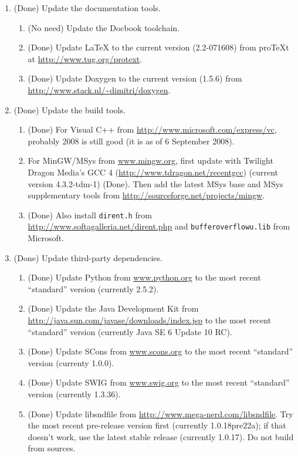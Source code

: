 \documentclass[11pt,letterpaper,onecolumn]{scrartcl}
\begin{document}
\begin{sloppypar}
\begin{enumerate}
	\item (Done) Update the documentation tools.
		\begin{enumerate}
	    \item (No need) Update the Docbook toolchain.
	    \item (Done) Update LaTeX to the current version (2.2-071608) from proTeXt at \url{http://www.tug.org/protext}.
	    \item (Done) Update Doxygen to the current version (1.5.6) from \url{http://www.stack.nl/~dimitri/doxygen}.
		\end{enumerate}
	\item (Done) Update the build tools.   
		\begin{enumerate}
			\item (Done) For Visual C++ from \url{http://www.microsoft.com/express/vc}, probably 2008 is still good (it is as of 6 September 2008). 
			\item For MinGW/MSys from \url{www.mingw.org}, first update with Twilight Dragon Media's GCC 4 (\url{http://www.tdragon.net/recentgcc}) (current version 4.3.2-tdm-1) (Done). Then add the latest MSys base and MSys supplementary tools from \url{http://sourceforge.net/projects/mingw}.
			\item (Done) Also install \texttt{dirent.h} from \url{http://www.softagalleria.net/dirent.php} and \texttt{bufferoverflowu.lib}  from Microsoft.
		\end{enumerate}    
	\item (Done) Update third-party dependencies.   
		\begin{enumerate}
  		\item (Done) Update Python from \url{www.python.org} to the most recent ``standard'' version (currently 2.5.2).
	    \item (Done) Update the Java Development Kit from \url{http://java.sun.com/javase/downloads/index.jsp} to the most recent ``standard'' version (currently Java SE 6 Update 10 RC).
	    \item (Done) Update SCons from \url{www.scons.org} to the most recent ``standard'' version (currenty 1.0.0).
	    \item (Done) Update SWIG from \url{www.swig.org} to the most recent ``standard'' version (currently 1.3.36).
			\item (Done) Update libsndfile from \url{http://www.mega-nerd.com/libsndfile}. Try the most recent pre-release version first (currently 1.0.18pre22a); if that doesn't work, use the latest stable release (currently 1.0.17). Do not build from sources. 

\end{enumerate}
\end{enumerate}
\end{sloppypar}
\end{document}

